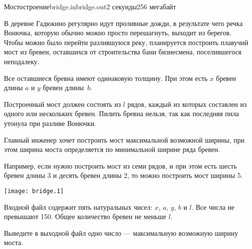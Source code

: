 \begin{problem}{Мостостроение}{bridge.in}{bridge.out}{2 секунды}{256 мегабайт}



В деревне Гадюкино регулярно идут проливные дожди, в результате
чего речка Вонючка, которую обычно можно просто перешагнуть, выходит
из берегов. Чтобы можно было перейти разлившуюся реку, планируется 
построить плавучий мост из бревен, оставшихся от строительства
бани бизнесмена, поселившегося неподалеку.

Все оставшиеся бревна имеют одинаковую толщину. При этом есть $x$ бревен
длины $a$ и $y$ бревен длины~$b$.
                            
Построенный мост должен состоять из $l$ рядов, каждый из которых
составлен из одного или нескольких бревен. Пилить бревна нельзя,
так как последняя пила утонула при разливе Вонючки.

Главный инженер хочет построить мост максимальной возможной
ширины, при этом ширина моста определяется по минимальной ширине
ряда бревен.

Например, если нужно построить мост из семи рядов, и при этом есть
шесть бревен длины 3 и десять бревен длины 2, то можно
построить мост ширины 5.

\begin{center}
\texttt{[image: bridge.1]}
\end{center}

\InputFile

Входной файл содержит пять натуральных чисел: $x$, $a$, $y$, $b$ и $l$.
Все числа не превышают 150. Общее количество бревен не меньше $l$.

\OutputFile

Выведите в выходной файл одно число --- максимальную возможную ширину моста.

\Examples

\begin{example}%
%
%
\end{example}

\end{problem}
             
